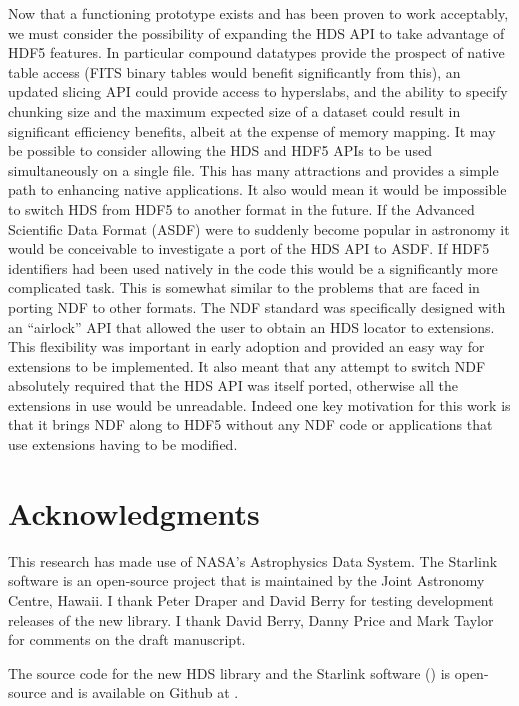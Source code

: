 \documentclass[final,authoryear,5p,times,twocolumn]{elsarticle}
\begin{document}
Now that a functioning prototype exists and has been proven to work
acceptably, we must consider the possibility of expanding the HDS API
to take advantage of HDF5 features. In particular compound datatypes
provide the prospect of native table access (FITS binary tables would
benefit significantly from this), an updated slicing API could provide
access to hyperslabs, and the ability to specify chunking size and the
maximum expected size of a dataset could result in significant
efficiency benefits, albeit at the expense of memory mapping. It may
be possible to consider allowing the HDS and HDF5 APIs to be used
simultaneously on a single file. This has many attractions and
provides a simple path to enhancing native applications. It also would
mean it would be impossible to switch HDS from HDF5 to another format
in the future. If the Advanced Scientific Data Format (ASDF)
\citep{asdf} were to suddenly become popular in astronomy it would be
conceivable to investigate a port of the HDS API to ASDF. If HDF5
identifiers had been used natively in the code this would be a
significantly more complicated task. This is somewhat similar to the
problems that are faced in porting NDF to other formats. The NDF
standard \citep{SGP38} was specifically designed with an ``airlock''
API that allowed the user to obtain an HDS locator to extensions. This
flexibility was important in early adoption and provided an easy way
for extensions to be implemented. It also meant that any attempt to
switch NDF absolutely required that the HDS API was itself ported,
otherwise all the extensions in use would be unreadable. Indeed one key
motivation for this work is that it brings NDF along to HDF5 without
any NDF code or applications that use extensions having to be
modified.

\section{Acknowledgments}

This research has made use of NASA's Astrophysics Data System.  The
Starlink software is an open-source project that is maintained by the
Joint Astronomy Centre, Hawaii. I thank Peter Draper and David Berry
for testing development releases of the new library. I thank David
Berry, Danny Price and Mark Taylor for comments on the draft manuscript.

The source code for the new HDS library and the Starlink software
() is open-source and is available on Github at
.
\end{document}
